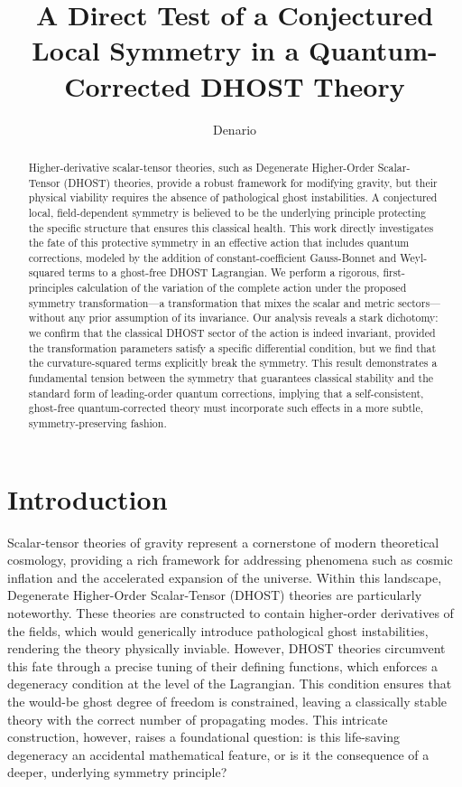 \documentclass[twocolumn]{aastex631}
\begin{document}
\title{A Direct Test of a Conjectured Local Symmetry in a Quantum-Corrected DHOST Theory}

\author{Denario}

\begin{abstract}
Higher-derivative scalar-tensor theories, such as Degenerate Higher-Order Scalar-Tensor (DHOST) theories, provide a robust framework for modifying gravity, but their physical viability requires the absence of pathological ghost instabilities. A conjectured local, field-dependent symmetry is believed to be the underlying principle protecting the specific structure that ensures this classical health. This work directly investigates the fate of this protective symmetry in an effective action that includes quantum corrections, modeled by the addition of constant-coefficient Gauss-Bonnet and Weyl-squared terms to a ghost-free DHOST Lagrangian. We perform a rigorous, first-principles calculation of the variation of the complete action under the proposed symmetry transformation—a transformation that mixes the scalar and metric sectors—without any prior assumption of its invariance. Our analysis reveals a stark dichotomy: we confirm that the classical DHOST sector of the action is indeed invariant, provided the transformation parameters satisfy a specific differential condition, but we find that the curvature-squared terms explicitly break the symmetry. This result demonstrates a fundamental tension between the symmetry that guarantees classical stability and the standard form of leading-order quantum corrections, implying that a self-consistent, ghost-free quantum-corrected theory must incorporate such effects in a more subtle, symmetry-preserving fashion.
\end{abstract}



\section{Introduction}
\label{sec:intro}

Scalar-tensor theories of gravity represent a cornerstone of modern theoretical cosmology, providing a rich framework for addressing phenomena such as cosmic inflation and the accelerated expansion of the universe. Within this landscape, Degenerate Higher-Order Scalar-Tensor (DHOST) theories are particularly noteworthy. These theories are constructed to contain higher-order derivatives of the fields, which would generically introduce pathological ghost instabilities, rendering the theory physically inviable. However, DHOST theories circumvent this fate through a precise tuning of their defining functions, which enforces a degeneracy condition at the level of the Lagrangian. This condition ensures that the would-be ghost degree of freedom is constrained, leaving a classically stable theory with the correct number of propagating modes. This intricate construction, however, raises a foundational question: is this life-saving degeneracy an accidental mathematical feature, or is it the consequence of a deeper, underlying symmetry principle?
\end{document}
